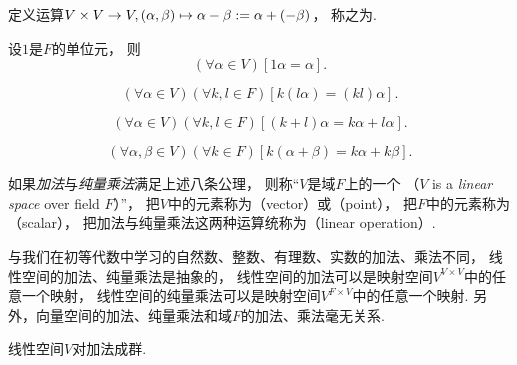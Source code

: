 \begin{definition}
\begin{itemize}
\begin{axiom}[负元的存在性]
			定义运算\(
				V\times V \to V,
				(\alpha,\beta) \mapsto \alpha-\beta := \alpha+(-\beta)
			\)，
			称之为.
		\end{axiom}
		\begin{axiom}[域的单位元]\label{definition:线性空间.运算法则5}
			设\(1\)是\(F\)的单位元，
			则\begin{equation*}
				(\forall \alpha \in V)
				[
					1 \alpha = \alpha
				].
			\end{equation*}
		\end{axiom}
		\begin{axiom}[纯量乘法结合律]\label{definition:线性空间.运算法则6}
			\begin{equation*}
				(\forall \alpha \in V)
				(\forall k,l \in F)
				[
					k (l \alpha)
					= (k l) \alpha
				].
			\end{equation*}
		\end{axiom}
		\begin{axiom}[纯量乘法右分配律]\label{definition:线性空间.运算法则7}
			\begin{equation*}
				(\forall \alpha \in V)
				(\forall k,l \in F)
				[
					(k + l) \alpha
					= k \alpha + l\alpha
				].
			\end{equation*}
		\end{axiom}
		\begin{axiom}[纯量乘法左分配律]\label{definition:线性空间.运算法则8}
			\begin{equation*}
				(\forall \alpha,\beta \in V)
				(\forall k\in F)
				[
					k (\alpha + \beta)
					= k \alpha + k \beta
				].
			\end{equation*}
		\end{axiom}
\end{itemize}
\endgroup
如果\emph{加法}与\emph{纯量乘法}满足上述八条公理，
则称“\(V\)是域\(F\)上的一个%
（\(V\) is a \emph{linear space} over field \(F\)）”，
把\(V\)中的元素称为（vector）或（point），
把\(F\)中的元素称为（scalar），
把加法与纯量乘法这两种运算统称为（linear operation）.
\end{definition}
\begin{remark}
与我们在初等代数中学习的自然数、整数、有理数、实数的加法、乘法不同，
线性空间的加法、纯量乘法是抽象的，
线性空间的加法可以是映射空间\(V^{V \times V}\)中的任意一个映射，
线性空间的纯量乘法可以是映射空间\(V^{F \times V}\)中的任意一个映射.
另外，向量空间的加法、纯量乘法和域\(F\)的加法、乘法毫无关系.
\end{remark}
\begin{remark}
线性空间\(V\)对加法成群.
\end{remark}

